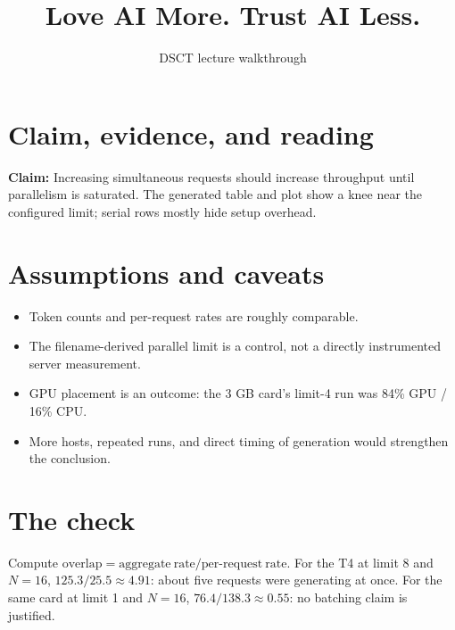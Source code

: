 \documentclass{article}\usepackage[margin=1in]{geometry}\usepackage{booktabs}\usepackage{graphicx}\usepackage{xcolor}\usepackage{hyperref}
\title{Love AI More. Trust AI Less.}\author{DSCT lecture walkthrough}\date{}
\begin{document}
\sloppy\maketitle
\section{Claim, evidence, and reading}\textbf{Claim:} Increasing simultaneous requests should increase throughput until parallelism is saturated. The generated table and plot show a knee near the configured limit; serial rows mostly hide setup overhead.
\section{Assumptions and caveats}\begin{itemize}\item Token counts and per-request rates are roughly comparable.\item The filename-derived parallel limit is a control, not a directly instrumented server measurement.\item GPU placement is an outcome: the 3 GB card's limit-4 run was 84\% GPU / 16\% CPU.\item More hosts, repeated runs, and direct timing of generation would strengthen the conclusion.\end{itemize}
\section{The check}Compute $\mathrm{overlap}=\mathrm{aggregate\ rate}/\mathrm{per\mbox{-}request\ rate}$. For the T4 at limit 8 and $N=16$, $125.3/25.5\approx4.91$: about five requests were generating at once. For the same card at limit 1 and $N=16$, $76.4/138.3\approx0.55$: no batching claim is justified.
\end{document}

